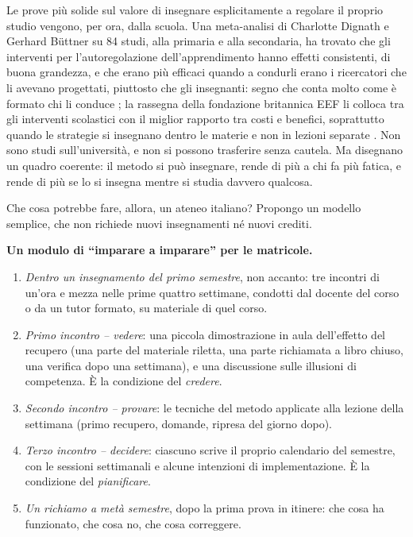 Le prove più solide sul valore di insegnare esplicitamente a
regolare il proprio studio vengono, per ora, dalla scuola. Una
meta-analisi di Charlotte Dignath e Gerhard Büttner su 84 studi, alla
primaria e alla secondaria, ha trovato che gli interventi per
l'autoregolazione dell'apprendimento hanno effetti consistenti, di
buona grandezza, e che erano più efficaci quando a condurli erano i
ricercatori che li avevano progettati, piuttosto che gli insegnanti:
segno che conta molto come è formato chi li conduce
\parencite{dignath2008}; la rassegna della fondazione
britannica EEF li colloca tra gli interventi scolastici con il miglior
rapporto tra costi e benefici, soprattutto quando le strategie si
insegnano dentro le materie e non in lezioni separate
\parencite{eef2025}. Non sono studi sull'università, e non si possono
trasferire senza cautela. Ma disegnano un quadro coerente: il metodo si
può insegnare, rende di più a chi fa più fatica, e rende di più se
lo si insegna mentre si studia davvero qualcosa.

Che cosa potrebbe fare, allora, un ateneo italiano? Propongo un
modello semplice, che non richiede nuovi insegnamenti né nuovi
crediti.

\begin{inpratica}
\textbf{Un modulo di \enquote{imparare a imparare} per le matricole.}
\begin{enumerate}
  \item \emph{Dentro un insegnamento del primo semestre}, non accanto:
        tre incontri di un'ora e mezza nelle prime quattro settimane,
        condotti dal docente del corso o da un tutor formato, su
        materiale di quel corso.
  \item \emph{Primo incontro -- vedere}: una piccola dimostrazione in
        aula dell'effetto del recupero (una parte del materiale
        riletta, una parte richiamata a libro chiuso, una verifica dopo
        una settimana), e una discussione sulle illusioni di
        competenza. È la condizione del \emph{credere}.
  \item \emph{Secondo incontro -- provare}: le tecniche del metodo
        applicate alla lezione della settimana (primo recupero,
        domande, ripresa del giorno dopo).
  \item \emph{Terzo incontro -- decidere}: ciascuno scrive il proprio
        calendario del semestre, con le sessioni settimanali e alcune
        intenzioni di implementazione. È la condizione del
        \emph{pianificare}.
  \item \emph{Un richiamo a metà semestre}, dopo la prima prova in
        itinere: che cosa ha funzionato, che cosa no, che cosa
        correggere.
\end{enumerate}
\end{inpratica}

